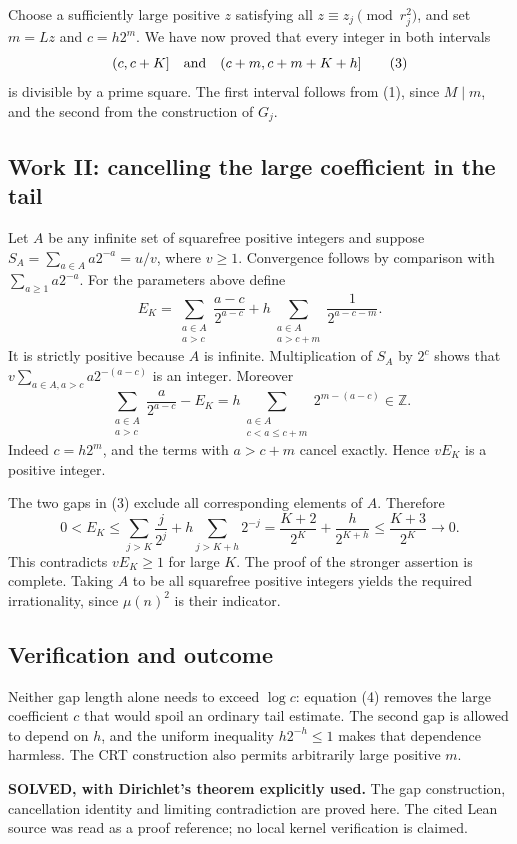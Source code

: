 Choose a sufficiently large positive $z$ satisfying all $z\equiv z_j\pmod{r_j^2}$, and set $m=Lz$ and $c=h2^m$. We have now proved that every integer in both intervals
\[
 (c,c+K]\quad\hbox{and}\quad(c+m,c+m+K+h]
 \tag{3}
\]
is divisible by a prime square. The first interval follows from (1), since $M\mid m$, and the second from the construction of $G_j$.

\subsection{Work II: cancelling the large coefficient in the tail}
Let $A$ be any infinite set of squarefree positive integers and suppose
$S_A=\sum_{a\in A}a2^{-a}=u/v$, where $v\ge1$. Convergence follows by comparison with $\sum_{a\ge1}a2^{-a}$. For the parameters above define
\[
 E_K=\sum_{\substack{a\in A\\a>c}}\frac{a-c}{2^{a-c}}
       +h\sum_{\substack{a\in A\\a>c+m}}\frac1{2^{a-c-m}}.
\]
It is strictly positive because $A$ is infinite. Multiplication of $S_A$ by $2^c$ shows that
$v\sum_{a\in A,a>c}a2^{-(a-c)}$ is an integer. Moreover
\[
 \sum_{\substack{a\in A\\a>c}}\frac{a}{2^{a-c}}-E_K
 =h\sum_{\substack{a\in A\\c<a\le c+m}}2^{m-(a-c)}\in\mathbb Z.
 \tag{4}
\]
Indeed $c=h2^m$, and the terms with $a>c+m$ cancel exactly. Hence $vE_K$ is a positive integer.

The two gaps in (3) exclude all corresponding elements of $A$. Therefore
\[
 0<E_K\le\sum_{j>K}\frac{j}{2^j}
          +h\sum_{j>K+h}2^{-j}
 =\frac{K+2}{2^K}+\frac{h}{2^{K+h}}
 \le\frac{K+3}{2^K}\longrightarrow0.
\]
This contradicts $vE_K\ge1$ for large $K$. The proof of the stronger assertion is complete. Taking $A$ to be all squarefree positive integers yields the required irrationality, since $\mu(n)^2$ is their indicator.

\subsection{Verification and outcome}
Neither gap length alone needs to exceed $\log c$: equation (4) removes the large coefficient $c$ that would spoil an ordinary tail estimate. The second gap is allowed to depend on $h$, and the uniform inequality $h2^{-h}\le1$ makes that dependence harmless. The CRT construction also permits arbitrarily large positive $m$.

\textbf{SOLVED, with Dirichlet's theorem explicitly used.} The gap construction, cancellation identity and limiting contradiction are proved here. The cited Lean source was read as a proof reference; no local kernel verification is claimed.

